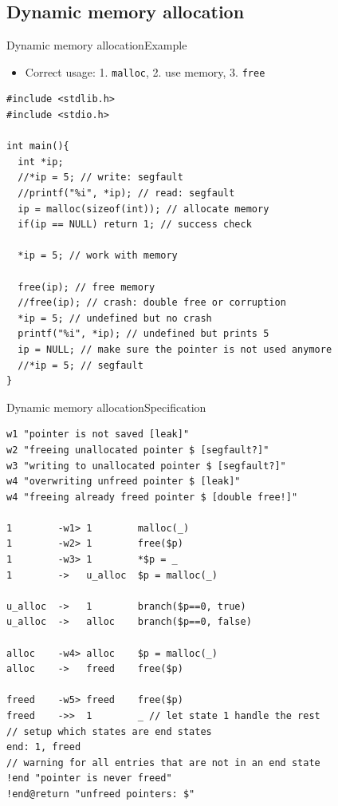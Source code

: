 \documentclass{beamer}
\newcommand{\inlineC}[1]{\lstinline[language=C]$#1$}
\begin{document}
\subsection{Dynamic memory allocation}

\begin{frame}[fragile]{Dynamic memory allocation}{Example}
\begin{itemize}
\item Correct usage: 1. \inlineC{malloc}, 2. use memory, 3. \inlineC{free}
\end{itemize}
\begin{lstlisting}[basicstyle=\scriptsize\ttfamily]
#include <stdlib.h>
#include <stdio.h>

int main(){
  int *ip;
  //*ip = 5; // write: segfault
  //printf("%i", *ip); // read: segfault
  ip = malloc(sizeof(int)); // allocate memory
  if(ip == NULL) return 1; // success check

  *ip = 5; // work with memory

  free(ip); // free memory
  //free(ip); // crash: double free or corruption
  *ip = 5; // undefined but no crash
  printf("%i", *ip); // undefined but prints 5
  ip = NULL; // make sure the pointer is not used anymore
  //*ip = 5; // segfault
}
\end{lstlisting}
\end{frame}

\begin{frame}{Dynamic memory allocation}{Specification}
\begin{lstlisting}[basicstyle=\scriptsize\ttfamily]
w1 "pointer is not saved [leak]"
w2 "freeing unallocated pointer $ [segfault?]"
w3 "writing to unallocated pointer $ [segfault?]"
w4 "overwriting unfreed pointer $ [leak]"
w4 "freeing already freed pointer $ [double free!]"

1        -w1> 1        malloc(_)
1        -w2> 1        free($p)
1        -w3> 1        *$p = _
1        ->   u_alloc  $p = malloc(_)

u_alloc  ->   1        branch($p==0, true)
u_alloc  ->   alloc    branch($p==0, false)

alloc    -w4> alloc    $p = malloc(_)
alloc    ->   freed    free($p)

freed    -w5> freed    free($p)
freed    ->>  1        _ // let state 1 handle the rest
// setup which states are end states
end: 1, freed
// warning for all entries that are not in an end state
!end "pointer is never freed"
!end@return "unfreed pointers: $"
\end{lstlisting}
\end{frame}
\end{document}
